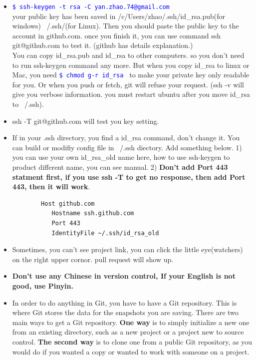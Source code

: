 \documentclass[a4paper,12pt,twoside]{book}
\newcommand{\linuxcommand}[1]{\texttt{\textcolor{blue}{\$ #1 \Pisymbol{psy}{191}}}}
\begin{document}
\begin{itemize}
\item \linuxcommand{ssh-keygen -t rsa -C yan.zhao.74@gmail.com} \\
        	your public key has been saved in /c/Users/zhao/.ssh/id\_rsa.pub(for windows) ~/.ssh/(for Linux). Then you should paste the public key to the account in github.com. once you finish it, you can use command ssh git@github.com to test it. (github has details explanation.)\\
		You can copy id\_rsa.pub and id\_rsa to other computers. so you don't need to run ssh-keygen command any more. But when you copy id\_rsa to linux or Mac, you need \linuxcommand{chmod g-r id\_rsa} to make your private key only readable for you. Or when you push or fetch, git will refuse your request.  (ssh -v will give you verbose information. you must restart ubuntu after you move id\_rsa to ~/.ssh).


         \item{ssh -T git@github.com} will test you key setting.

\item If in your .ssh directory, you find a id\_rsa command, don't change it. You can build or modifiy config file in ~/.ssh diectory. Add something below. 1) you can use your own id\_rsa\_old name here, how to use ssh-keygen to product different name, you can see manual. 2) \textbf{Don't add Port 443 statment first, if you use ssh -T to get no response, then add Port 443, then it will work}.
		\begin{verbatim}
		Host github.com
		   Hostname ssh.github.com
		   Port 443
		   IdentityFile ~/.ssh/id_rsa_old
		\end{verbatim}

    \item Sometimes, you can't see project link, you can click the little eye(watchers) on the right upper cornor.
        pull request will show up.

\item \textbf{Don't use any Chinese in version control, If your English is not good, use
    Pinyin.}
\item In order to do anything in Git, you have to have a Git repository. This is where Git
    stores the data for the snapshots you are saving. There are two main ways to get a
    Git repository. \textbf{One way} is to simply initialize a new one from an existing
    directory, such as a new project or a project new to source control. \textbf{The
    second way} is to clone one from a public Git repository, as you would do if you
    wanted a copy or wanted to work with someone on a project.
\end{itemize}
\end{document}
